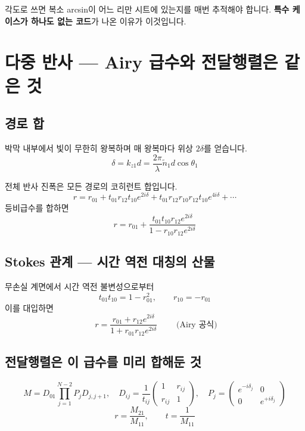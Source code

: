 \documentclass[10pt,a4paper]{article}
\newcommand{\nt}{\tilde n}
\begin{document}
각도로 쓰면 복소 arcsin이 어느 리만 시트에 있는지를 매번 추적해야 합니다. \textbf{특수 케이스가 하나도 없는 코드}가 나온 이유가 이것입니다.

\section{다중 반사 — Airy 급수와 전달행렬은 같은 것}

\subsection{경로 합}

박막 내부에서 빛이 무한히 왕복하며 매 왕복마다 위상 $2\delta$를 얻습니다.
\begin{equation}
\delta = k_{z1}d = \frac{2\pi}{\lambda}\nt_1 d\cos\theta_1
\end{equation}

전체 반사 진폭은 모든 경로의 코히런트 합입니다.
\begin{equation}
r = r_{01} + t_{01}r_{12}t_{10}e^{2i\delta} + t_{01}r_{12}r_{10}r_{12}t_{10}e^{4i\delta}+\cdots
\end{equation}
등비급수를 합하면
\begin{equation}
r = r_{01} + \frac{t_{01}t_{10}r_{12}e^{2i\delta}}{1-r_{10}r_{12}e^{2i\delta}}
\end{equation}

\subsection{Stokes 관계 — 시간 역전 대칭의 산물}

무손실 계면에서 시간 역전 불변성으로부터
\begin{equation}
t_{01}t_{10} = 1-r_{01}^2, \qquad r_{10} = -r_{01}
\end{equation}
이를 대입하면
\begin{equation}
\boxed{\;r = \frac{r_{01}+r_{12}e^{2i\delta}}{1+r_{01}r_{12}e^{2i\delta}}\;}\qquad\text{(Airy 공식)}
\end{equation}

\subsection{전달행렬은 이 급수를 미리 합해둔 것}

\begin{equation}
M = D_{01}\prod_{j=1}^{N-2}P_j D_{j,j+1},\quad
D_{ij}=\frac{1}{t_{ij}}\begin{pmatrix}1&r_{ij}\\r_{ij}&1\end{pmatrix},\quad
P_j=\begin{pmatrix}e^{-i\delta_j}&0\\0&e^{+i\delta_j}\end{pmatrix}
\end{equation}
\begin{equation}
r=\frac{M_{21}}{M_{11}},\qquad t=\frac{1}{M_{11}}
\end{equation}
\end{document}
